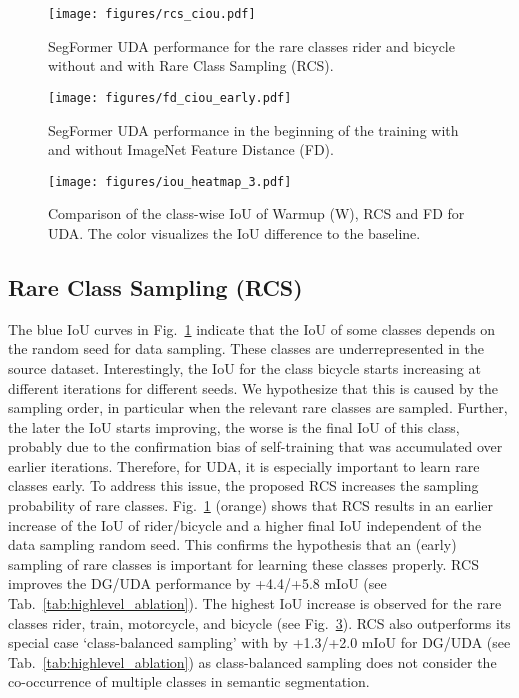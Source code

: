\documentclass[journal,compsoc]{IEEEtran}
\begin{document}
\begin{figure}
\centering
\texttt{[image: figures/rcs\_ciou.pdf]}
\vspace{-0.8cm}
\caption{SegFormer UDA performance for the rare classes rider and bicycle without and with Rare Class Sampling (RCS).}
\label{fig:RCS_iou}
\end{figure}
\begin{figure}
\centering
\texttt{[image: figures/fd\_ciou\_early.pdf]}
\vspace{-0.8cm}
\caption{SegFormer UDA performance in the beginning of the training with and without ImageNet Feature Distance (FD).}
\label{fig:fd_iou}
\end{figure}


\begin{figure}
\centering
\texttt{[image: figures/iou\_heatmap\_3.pdf]}
\vspace{-0.8cm}
\caption{Comparison of the class-wise IoU of Warmup (W), RCS and FD for UDA. The color visualizes the IoU difference to the baseline.}
\label{fig:ciou_heatmap}
\end{figure}


\subsection{Rare Class Sampling (RCS)}
\label{sec:exp_rcs}

The blue IoU curves in Fig.~\ref{fig:RCS_iou} indicate that the IoU of some classes depends on the random seed for data sampling. These classes are underrepresented in the source dataset. Interestingly, the IoU for the class bicycle starts increasing at different iterations for different seeds. We hypothesize that this is caused by the sampling order, in particular when the relevant rare classes are sampled. Further, the later the IoU starts improving, the worse is the final IoU of this class, probably due to the confirmation bias of self-training that was accumulated over earlier iterations.
Therefore, for UDA, it is especially important to learn rare classes early.
To address this issue, the proposed RCS increases the sampling probability of rare classes.
Fig.~\ref{fig:RCS_iou} (orange) shows that RCS results in an earlier increase of the IoU of rider/bicycle and a higher final IoU independent of the data sampling random seed. This confirms the hypothesis that an (early) sampling of rare classes is important for learning these classes properly. 
RCS improves the DG/UDA performance by +4.4/+5.8 mIoU (see Tab.~\ref{tab:highlevel_ablation}).
The highest IoU increase is observed for the rare classes rider, train, motorcycle, and bicycle (see Fig.~\ref{fig:ciou_heatmap}).
RCS also outperforms its special case `class-balanced sampling' with  by +1.3/+2.0 mIoU for DG/UDA (see Tab.~\ref{tab:highlevel_ablation}) as class-balanced sampling does not consider the co-occurrence of multiple classes in semantic segmentation.
\end{document}
